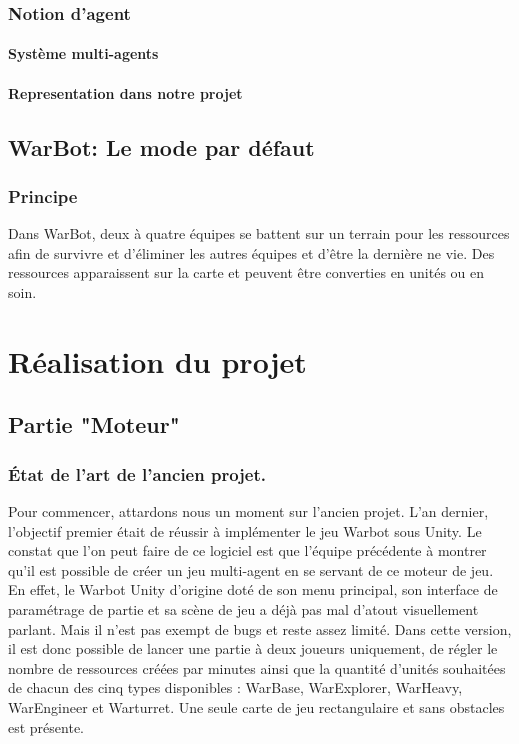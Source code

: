 \documentclass{report}
\begin{document}
\section{Notion d'agent}

\subsection{Système multi-agents}

\subsection{Representation dans notre projet}

\newpage

\chapter{WarBot: Le mode par défaut}
\section{Principe}
Dans WarBot, deux à quatre équipes se battent sur un terrain pour les ressources afin de survivre et d'éliminer les autres équipes et d’être la dernière ne vie. Des ressources apparaissent sur la carte et peuvent être converties en unités ou en soin.

\newpage
\part{Réalisation du projet}
\newpage

\chapter{Partie "Moteur"}

\section{État de l'art de l'ancien projet.}

Pour commencer, attardons nous un moment sur l'ancien projet. L'an dernier, l'objectif premier était de réussir à implémenter le jeu Warbot sous Unity. Le constat que l'on peut faire de ce logiciel est que l'équipe précédente à montrer qu'il est possible de créer un jeu multi-agent en se servant de ce moteur de jeu.
En effet, le Warbot Unity d'origine doté de son menu principal, son interface de paramétrage de partie et sa scène de jeu a déjà pas mal d'atout visuellement parlant. Mais il n'est pas exempt de bugs et reste assez limité.
Dans cette version, il est donc possible de lancer une partie à deux joueurs uniquement, de régler le nombre de ressources créées par minutes ainsi que la quantité d'unités souhaitées de chacun des cinq types disponibles : WarBase, WarExplorer, WarHeavy, WarEngineer et Warturret. Une seule carte de jeu rectangulaire et sans obstacles est présente. 
\end{document}

